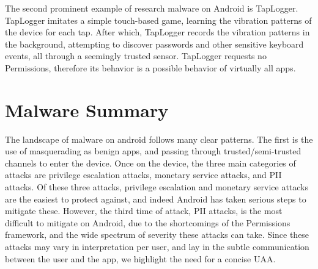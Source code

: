 The second prominent example of research malware on Android is TapLogger\citep{xu2012taplogger}. TapLogger imitates a simple touch-based game, learning the vibration patterns of the device for each tap. After which, TapLogger records the vibration patterns in the background, attempting to discover passwords and other sensitive keyboard events, all through a seemingly trusted sensor. TapLogger requests no Permissions, therefore its behavior is a possible behavior of virtually all apps. 

\section{Malware Summary}
The landscape of malware on android follows many clear patterns. The first is the use of masquerading as benign apps, and passing through trusted/semi-trusted channels to enter the device. Once on the device, the three main categories of attacks are privilege escalation attacks, monetary service attacks, and PII attacks. Of these three attacks, privilege escalation and monetary service attacks are the easiest to protect against, and indeed Android has taken serious steps to mitigate these. However, the third time of attack, PII attacks, is the most difficult to mitigate on Android, due to the shortcomings of the Permissions framework, and the wide spectrum of severity these attacks can take. Since these attacks may vary in interpretation per user, and lay in the subtle communication between the user and the app, we highlight the need for a concise UAA.
